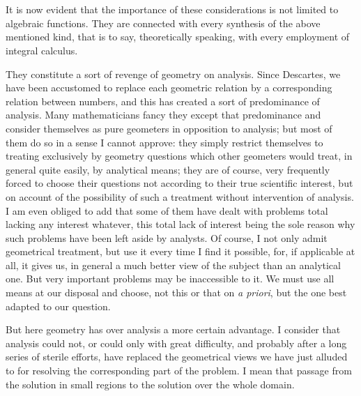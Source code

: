 \documentclass[12pt,oneside]{book}
\begin{document}
\section{}

It is now evident that the importance of these considerations is not limited to
algebraic functions. They are connected with every synthesis of the above
mentioned kind, that is to say, theoretically speaking, with every employment of
integral calculus. \par

They constitute a sort of revenge of geometry on analysis. Since Descartes, we
have been accustomed to replace each geometric relation by a corresponding
relation between numbers, and this has created a sort of predominance of
analysis. Many mathematicians fancy they except that predominance and consider
themselves as pure geometers in opposition to analysis; but most of them do so
in a sense I cannot approve: they simply restrict themselves to treating
exclusively by geometry questions which other geometers would treat, in general
quite easily, by analytical means; they are of course, very frequently forced to
choose their questions not according to their true scientific interest, but on
account of the possibility of such a treatment without intervention of analysis.
I am even obliged to add that some of them have dealt with problems total
lacking any interest whatever, this total lack of interest being the sole reason
why such problems have been left aside by analysts. Of course, I not only admit
geometrical treatment, but use it every time I find it possible, for, if
applicable at all, it gives us, in general a much better view of the subject
than an analytical one. But very important problems may be inaccessible to it.
We must use all means at our disposal and choose, not this or that on \textit{a
priori}, but the one best adapted to our question. \par

But here geometry has over analysis a more certain advantage. I consider that
analysis could not, or could only with great difficulty, and probably after a
long series of sterile efforts, have replaced the geometrical views we have just
alluded to for resolving the corresponding part of the problem. I mean that
passage from the solution in small regions to the solution over the whole
domain.\footnotemark \par

\end{document}
